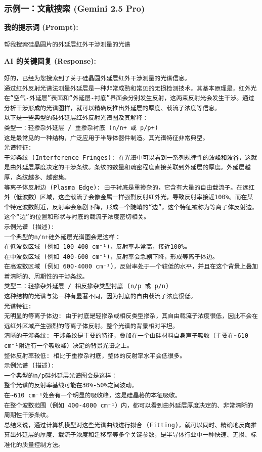 \documentclass[a4paper]{ctexart}
\begin{document}
\subsubsection{示例一：文献搜索 (Gemini 2.5 Pro)}
\noindent\textbf{我的提示词 (Prompt):}
\begin{verbatim}
帮我搜索硅晶圆片的外延层红外干涉测量的光谱
\end{verbatim}

\noindent\textbf{AI 的关键回复 (Response):}
\begin{lstlisting}
好的，已经为您搜索到了关于硅晶圆外延层红外干涉测量的光谱信息。
通过红外反射光谱法测量外延层是一种非常成熟和常见的无损检测技术。其基本原理是，红外光在“空气-外延层”表面和“外延层-衬底”界面会分别发生反射，这两束反射光会发生干涉。通过分析干涉形成的光谱图样，就可以精确反推出外延层的厚度、载流子浓度等信息。
以下是一些典型的硅外延层红外反射光谱图及其解释：
类型一：轻掺杂外延层 / 重掺杂衬底 (n/n+ 或 p/p+)
这是最常见的一种结构，广泛应用于半导体器件制造。其光谱特征非常典型。
光谱特征:
干涉条纹 (Interference Fringes): 在光谱中可以看到一系列规律性的波峰和波谷，这就是由外延层厚度决定的干涉条纹。条纹的数量和疏密程度直接关联到外延层的厚度。外延层越厚，条纹越多、越密集。
等离子体反射边 (Plasma Edge): 由于衬底是重掺杂的，它含有大量的自由载流子。在远红外（低波数）区域，这些载流子会像金属一样强烈反射红外光，导致反射率接近100%。而在某个特定波数附近，反射率会急剧下降，形成一个陡峭的“边”，这个特征被称为等离子体反射边。这个“边”的位置和形状与衬底的载流子浓度密切相关。
示例光谱 (描述):
一个典型的n/n+硅外延层光谱图会是这样：
在低波数区域 (例如 100-400 cm⁻¹)，反射率非常高，接近100%。
在中波数区域 (例如 400-600 cm⁻¹)，反射率会急剧下降，形成等离子体边。
在高波数区域 (例如 600-4000 cm⁻¹)，反射率处于一个较低的水平，并且在这个背景上叠加着清晰的、周期性的干涉条纹。
类型二：轻掺杂外延层 / 相反掺杂类型衬底 (n/p 或 p/n)
这种结构的光谱与第一种有显著不同，因为衬底的自由载流子浓度很低。
光谱特征:
无明显的等离子体边: 由于衬底是轻掺杂或相反类型掺杂，其自由载流子浓度很低，因此不会在远红外区域产生强烈的等离子体反射。整个光谱的背景相对平坦。
清晰的干涉条纹: 干涉条纹是主要的特征，叠加在一个由硅材料自身声子吸收（主要在~610 cm⁻¹附近有一个吸收峰）决定的背景光谱之上。
整体反射率较低: 相比于重掺杂衬底，整体的反射率水平会低很多。
示例光谱 (描述):
一个典型的n/p硅外延层光谱图会是这样：
整个光谱的反射率基线可能在30%-50%之间波动。
在~610 cm⁻¹处会有一个明显的吸收峰，这是硅晶格的本征吸收。
在整个波数范围（例如 400-4000 cm⁻¹）内，都可以看到由外延层厚度决定的、非常清晰的周期性干涉条纹。
总结来说，通过计算机模型对这些光谱曲线进行拟合 (Fitting)，就可以同时、精确地反向推算出外延层的厚度、载流子浓度和迁移率等多个关键参数，是半导体行业中一种快速、无损、标准化的质量控制方法。
\end{lstlisting}
\end{document}
